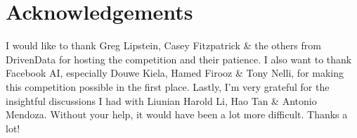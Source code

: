 \documentclass{article}
\begin{document}
\section{Acknowledgements}

I would like to thank Greg Lipstein, Casey Fitzpatrick \& the others from DrivenData for hosting the competition and their patience. I also want to thank Facebook AI, especially Douwe Kiela, Hamed Firooz \& Tony Nelli, for making this competition possible in the first place.
Lastly, I'm very grateful for the insightful discussions I had with Liunian Harold Li, Hao Tan \& Antonio Mendoza. Without your help, it would have been a lot more difficult. Thanks a lot!  




  
 
\end{document}
